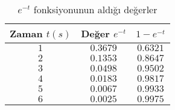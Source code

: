 \begin{table}[!htb]
    \centering
    \caption{$e^{-t}$ fonksiyonunun aldığı değerler}
    \label{tbl:exp_func}
    \begin{tabularx}{\textwidth}{ccc}\hline
        Zaman $t(s)$& Değer $e^{-t}$& $1-e^{-t}$\\[5pt]\hline
        $1$& $0.3679$& $0.6321$\\[5pt]
        $2$& $0.1353$& $0.8647$\\[5pt]
        $3$& $0.0498$& $0.9502$\\[5pt]
        $4$& $0.0183$& $0.9817$\\[5pt]
        $5$& $0.0067$& $0.9933$\\[5pt]
        $6$& $0.0025$& $0.9975$\\[5pt]\hline
    \end{tabularx}
\end{table}